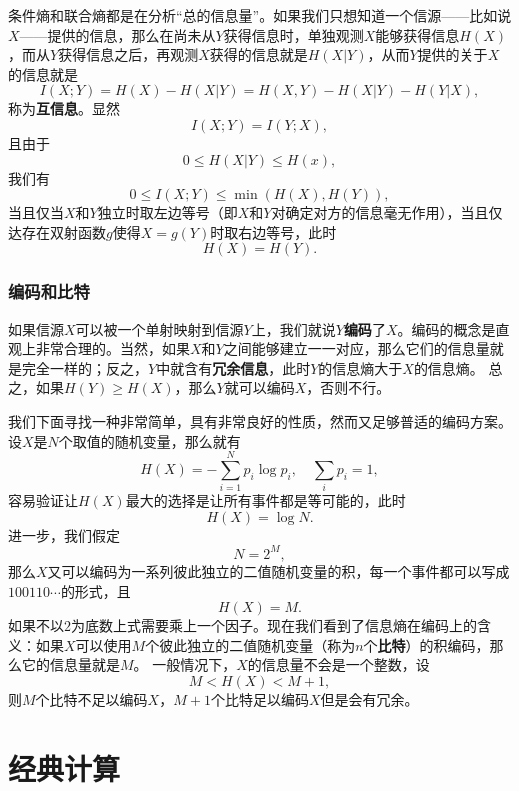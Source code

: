 \documentclass[UTF8, a4paper]{ctexart}
\begin{document}
条件熵和联合熵都是在分析“总的信息量”。如果我们只想知道一个信源——比如说$X$——提供的信息，那么在尚未从$Y$获得信息时，单独观测$X$能够获得信息$H(X)$，而从$Y$获得信息之后，再观测$X$获得的信息就是$H(X|Y)$，从而$Y$提供的关于$X$的信息就是
\begin{equation}
    I(X;Y) = H(X) - H(X|Y) = H(X, Y) - H(X|Y) - H(Y|X),
\end{equation}
称为\textbf{互信息}。显然
\begin{equation}
    I(X;Y) = I(Y;X),
\end{equation}
且由于
\[
    0 \leq H(X|Y) \leq H(x),
\]
我们有
\begin{equation}
    0 \leq I(X;Y) \leq \min(H(X), H(Y)),
\end{equation}
当且仅当$X$和$Y$独立时取左边等号（即$X$和$Y$对确定对方的信息毫无作用），当且仅达存在双射函数$g$使得$X=g(Y)$时取右边等号，此时
\[
    H(X) = H(Y).
\]

\subsubsection{编码和比特}

如果信源$X$可以被一个单射映射到信源$Y$上，我们就说$Y$\textbf{编码}了$X$。编码的概念是直观上非常合理的。当然，如果$X$和$Y$之间能够建立一一对应，那么它们的信息量就是完全一样的；反之，$Y$中就含有\textbf{冗余信息}，此时$Y$的信息熵大于$X$的信息熵。
总之，如果$H(Y) \geq H(X)$，那么$Y$就可以编码$X$，否则不行。

我们下面寻找一种非常简单，具有非常良好的性质，然而又足够普适的编码方案。设$X$是$N$个取值的随机变量，那么就有
\[
    H(X) = - \sum_{i=1}^N p_i \log p_i, \quad \sum_i p_i = 1,
\]
容易验证让$H(X)$最大的选择是让所有事件都是等可能的，此时
\begin{equation}
    H(X) = \log N.
\end{equation}
进一步，我们假定
\[
    N = 2^M,
\]
那么$X$又可以编码为一系列彼此独立的二值随机变量的积，每一个事件都可以写成$100110\cdots$的形式，且
\[
    H(X) = M.
\]
如果不以$2$为底数上式需要乘上一个因子。现在我们看到了信息熵在编码上的含义：如果$X$可以使用$M$个彼此独立的二值随机变量（称为$n$个\textbf{比特}）的积编码，那么它的信息量就是$M$。
一般情况下，$X$的信息量不会是一个整数，设
\[
    M < H(X) < M+1,
\]
则$M$个比特不足以编码$X$，$M+1$个比特足以编码$X$但是会有冗余。

\section{经典计算}
\end{document}
